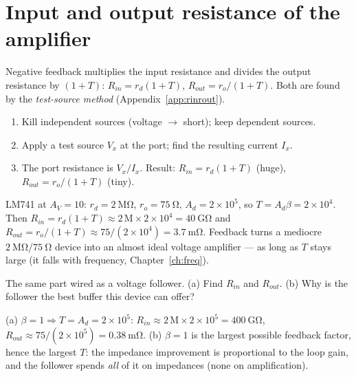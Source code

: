 \documentclass[11pt,a4paper,oneside]{book}
\newcommand{\Ad}{A_d}
\begin{document}
\section{Input and output resistance of the amplifier}
Negative feedback multiplies the input resistance and divides the output
resistance by $(1+T)$: $R_{in}=r_d(1+T)$, $R_{out}=r_o/(1+T)$. Both are found by
the \emph{test-source method} (Appendix~\ref{app:rinrout}).

\begin{protocol}
\begin{enumerate}[leftmargin=1.5cm]
  \item Kill independent sources (voltage $\to$ short); keep dependent sources.
  \item Apply a test source $V_x$ at the port; find the resulting current $I_x$.
  \item The port resistance is $V_x/I_x$. Result: $R_{in}=r_d(1+T)$ (huge),
        $R_{out}=r_o/(1+T)$ (tiny).
\end{enumerate}
\end{protocol}

\begin{wexample}
LM741 at $A_V=10$: $r_d=\qty{2}{\mega\ohm}$, $r_o=\qty{75}{\ohm}$,
$\Ad=2\times10^5$, so $T=\Ad\beta=2\times10^4$. Then
$R_{in}=r_d(1+T)\approx2\,\text{M}\times2\times10^4=\qty{40}{\giga\ohm}$ and
$R_{out}=r_o/(1+T)\approx75/(2\times10^4)=\qty{3.7}{\milli\ohm}$. Feedback turns
a mediocre $\qty{2}{\mega\ohm}/\qty{75}{\ohm}$ device into an almost ideal
voltage amplifier --- as long as $T$ stays large (it falls with frequency,
Chapter~\ref{ch:freq}).
\end{wexample}

\begin{exercise}
The same part wired as a voltage follower. (a) Find $R_{in}$ and $R_{out}$.
(b) Why is the follower the best buffer this device can offer?
\end{exercise}
\begin{solution}
(a) $\beta=1\Rightarrow T=\Ad=2\times10^5$:
$R_{in}\approx2\,\text{M}\times2\times10^5=\qty{400}{\giga\ohm}$,
$R_{out}\approx75/(2\times10^5)=\qty{0.38}{\milli\ohm}$.
(b) $\beta=1$ is the largest possible feedback factor, hence the largest $T$:
the impedance improvement is proportional to the loop gain, and the follower
spends \emph{all} of it on impedances (none on amplification).
\end{solution}
\end{document}
